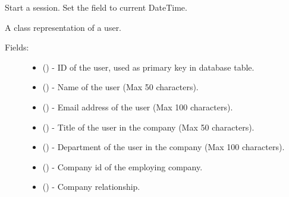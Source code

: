 \documentclass[letterpaper,10pt,english]{sphinxmanual}
\begin{document}
\begin{fulllineitems}
\begin{fulllineitems}
\end{fulllineitems}


\begin{fulllineitems}
\label{api:models.Session.start}
Start a session. Set the  field to current
DateTime.

\end{fulllineitems}


\end{fulllineitems}


\begin{fulllineitems}
\label{api:models.User}
A class representation of a user.
\begin{description}
\item[{Fields:}] \leavevmode\begin{itemize}
\item {} 
 () - ID of the user, used as primary key in database table.

\item {} 
 () - Name of the user (Max 50 characters).

\item {} 
 () - Email address of the user (Max 100 characters).

\item {} 
 () - Title of the user in the company (Max 50 characters).

\item {} 
 () - Department of the user in the company (Max 100 characters).

\item {} 
 () - Company id of the employing company.

\item {} 
 () - Company relationship.

\end{itemize}


\end{description}
\end{fulllineitems}
\end{document}
